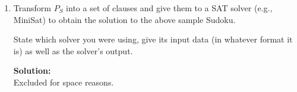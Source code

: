 \documentclass[11pt,a4paper]{uebung}
\newcommand{\solution}[1]{\par {\bf Solution:}\\#1}
\begin{document}
\begin{enumerate}
\solution{
  Using the formulas from $T_S$ above makes it easier to find a propositional
  theory $P_S$. Basically, all we have to do is getting rid of quantifiers.
  As a shorthand, let $D_S=\{1,2,3,4\}$ in the following.

  \begin{itemize}
  \item $P_{\mathit init} = T_{\mathit init}$ \\ as $T_{\mathit init}$ is
    already propositional.
  \item $P_{\mathit val} = \big\{ p(r,c,1) \lor p(r,c,2) \lor p(r,c,3) \lor
    p(r,c,4) \mid r,c \in D_S \big\}$ \\ enumerate all values for
    existentially-quantified variable $n$ and make a new formula for each
    combination of all-quantified variables $r,c$.
  \item $P_{\mathit val'} = \big\{ \neg\big( p(r,c,n) \land p(r,c,n') \big) \mid
    r,c,n,n' \in D_S  \land n \neq n' \big\}$ \\ ensure no cell is
    assigned two values.
  \item $P_{\mathit row} = \big\{ p(r,1,n) \lor \ldots \lor p(r,4,n) \mid r,n
    \in D_S \big\}$.
  \item $P_{\mathit col} = \big\{ p(1,c,n) \lor \ldots \lor p(4,c,n) \mid c,n
    \in D_S \big\}$.
  \item $P_{\mathit quarters} = \big\{ p(o,o',n) \lor p(o+1,o',n) \lor
    p(o,o'+1,n) \lor p(o,o'+1,n) \mid o,o' \in \{1,3\} \land n \in D_S \big\}$.
  \end{itemize}

  $P_S = \{ P_{\mathit init} \}  \cup  P_{\mathit val} \cup P_{\mathit val'}
  \cup P_{\mathit row} \cup P_{\mathit col} \cup P_{\mathit quarters}$ 
  then is a propositional encoding of the 4x4 Sudoku.
}

\item Transform $P_S$ into a set of clauses and give them to a SAT solver
  (e.g., MiniSat) to obtain the solution to the above sample Sudoku.

  State which solver you were using, give its input data (in whatever
  format it is) as well as the solver's output.

\solution{
  Excluded for space reasons.
}

\end{enumerate}

\newpage

\end{document}
